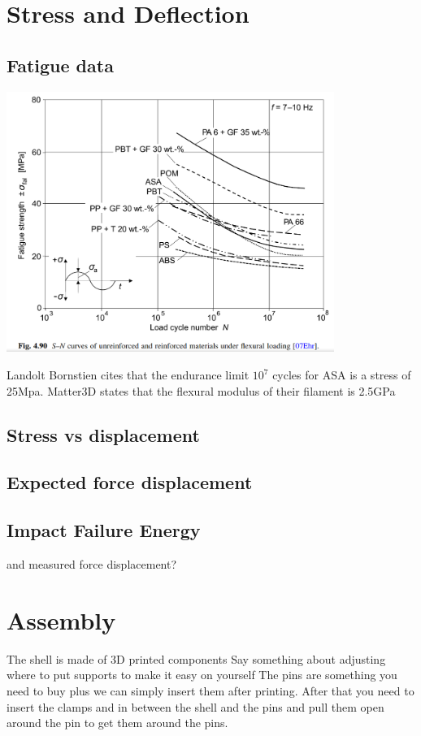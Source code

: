 \documentclass{iopart}
\begin{document}
\section{Stress and Deflection}
\subsection{Fatigue data}
\includegraphics[width=0.8\textwidth]{graphics/alternating_fatigue_strength.png}

Landolt Bornstien cites that the endurance limit $10^7$ cycles for ASA is a stress of 25Mpa. Matter3D states that the flexural modulus of their filament is 2.5GPa
\subsection{Stress vs displacement}
\subsection{Expected force displacement}
\subsection{Impact Failure Energy}
and measured force displacement?

\section{Assembly}
The shell is made of 3D printed components
Say something about adjusting where to put supports to make it easy on yourself
The pins are something you need to buy plus we can simply insert them after printing.
After that you need to insert the clamps and in between the shell and the pins and pull them open around the pin to get them around the pins.
\end{document}
